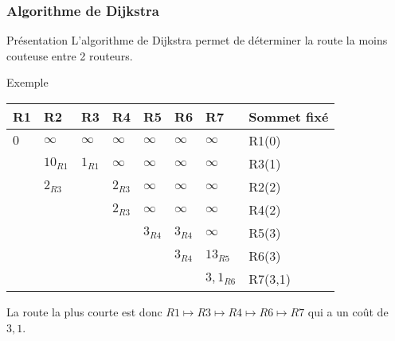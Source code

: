 \documentclass[8pt]{beamer}
\begin{document}
\begin{frame}
\frametitle{Algorithme de Dijkstra}

\begin{block}{Présentation}
L'algorithme de Dijkstra permet de déterminer la route la moins couteuse entre 2 routeurs.
\end{block}

\begin{exampleblock}{Exemple}
\begin{center}
\renewcommand\arraystretch{1.4}
\begin{tabular}{*{7}{|C{0.8cm}}|C{1.6cm}|}\hline 
R1 & R2 & R3 & R4 & R5 & R6 & R7 & Sommet fixé\\ \hline
$0$ & $\infty$ & $\infty$ & $\infty$ & $\infty$  & $\infty$ & $\infty$ & R1(0)\\ \hline
&$10_{R1}$&$1_{R1}$&$\infty$&$\infty$&$\infty$&$\infty$& R3(1)\\ \hline 
&$2_{R3}$&&$2_{R3}$&$\infty$&$\infty$&$\infty$&R2(2)\\ \hline 
&&&$2_{R3}$&$\infty$&$\infty$&$\infty$&R4(2)\\ \hline 
&&&&$3_{R4}$&$3_{R4}$&$\infty$&R5(3)\\ \hline 
&&&&&$3_{R4}$&$13_{R5}$&R6(3)\\ \hline 
&&&&&&$3,1_{R6}$&R7(3,1)\\ \hline 
\end{tabular}\medskip

La route la plus courte est donc $R1 \longmapsto R3 \longmapsto R4 \longmapsto R6 \longmapsto R7$ qui a un coût de $3,1$.
\end{center} 
\end{exampleblock}
\end{frame}
\end{document}
